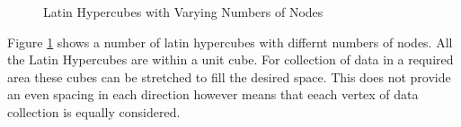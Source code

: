 \documentclass[a4paper,12pt,twoside]{article}
\begin{document}
\begin{figure}[H]
	\centering
	
	\caption{Latin Hypercubes with Varying Numbers of Nodes}
	\label{fig:latin_hypercubes_with_varying_numbers_of_nodes}
\end{figure}

Figure \ref{fig:latin_hypercubes_with_varying_numbers_of_nodes} shows a number of latin hypercubes with differnt numbers of nodes. All the Latin Hypercubes are within a unit cube. For collection of data in a required area these cubes can be stretched to fill the desired space. This does not provide an even spacing in each direction however means that eeach vertex of data collection is equally considered.
\end{document}
